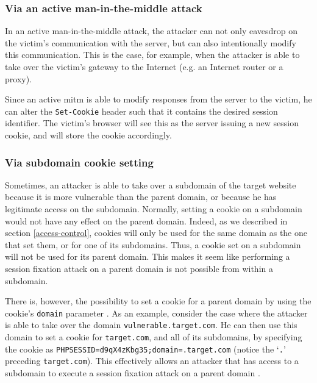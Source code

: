 \subsubsection{Via an active man-in-the-middle attack}

In an active man-in-the-middle attack, the attacker can not only eavesdrop on the victim's communication with the server, but can also intentionally modify this communication. This is the case, for example, when the attacker is able to take over the victim's gateway to the Internet (e.g. an Internet router or a proxy).

Since an active \gls{mitm} is able to modify responses from the server to the victim, he can alter the \texttt{Set-Cookie} header such that it contains the desired session identifier. The victim's browser will see this as the server issuing a new session cookie, and will store the cookie accordingly.

\subsubsection{Via subdomain cookie setting}\label{subdomain-setting}

Sometimes, an attacker is able to take over a subdomain of the target website because it is more vulnerable than the parent domain, or because he has legitimate access on the subdomain. Normally, setting a cookie on a subdomain would not have any effect on the parent domain. Indeed, as we described in section \ref{access-control}, cookies will only be used for the same domain as the one that set them, or for one of its subdomains. Thus, a cookie set on a subdomain will not be used for its parent domain. This makes it seem like performing a session fixation attack on a parent domain is not possible from within a subdomain.

There is, however, the possibility to set a cookie for a parent domain by using the cookie's \texttt{domain} parameter \cite{Kristol2001}. As an example, consider the case where the attacker is able to take over the domain \texttt{vulnerable.target.com}. He can then use this domain to set a cookie for \texttt{target.com}, and all of its subdomains, by specifying the cookie as \texttt{PHPSESSID=d9qX4zKbg35;domain=.target.com} (notice the `\texttt{.}' preceding \texttt{target.com}). This effectively allows an attacker that has access to a subdomain to execute a session fixation attack on a parent domain \cite{Kolsek2002}.

